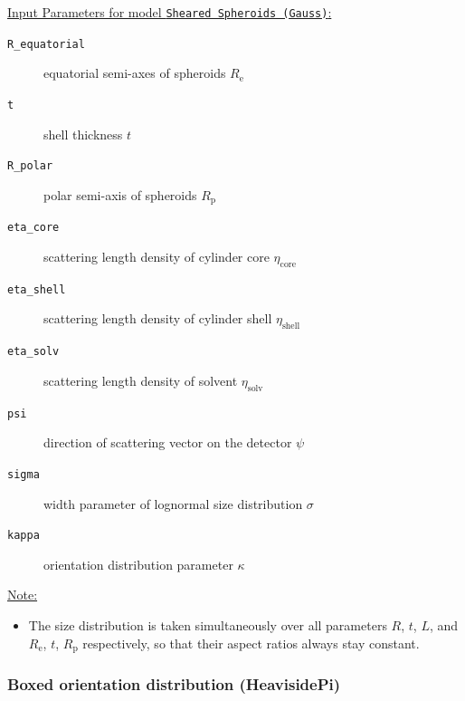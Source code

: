 \vspace{5mm}

\underline{Input Parameters for model \texttt{Sheared Spheroids (Gauss)}:}\\
\begin{description}
\item[\texttt{R\_equatorial}] equatorial semi-axes of spheroids $R_\mathrm{e}$
\item[\texttt{t}] shell thickness $t$
\item[\texttt{R\_polar}] polar semi-axis of spheroids $R_\mathrm{p}$
\item[\texttt{eta\_core}] scattering length density of cylinder core $\eta_\mathrm{core}$
\item[\texttt{eta\_shell}] scattering length density of cylinder shell $\eta_\mathrm{shell}$
\item[\texttt{eta\_solv}] scattering length density of solvent $\eta_\mathrm{solv}$
\item[\texttt{psi}] direction of scattering vector on the detector $\psi$
\item[{\texttt{sigma}}] width parameter of lognormal size distribution $\sigma$
\item[{\texttt{kappa}}] orientation distribution parameter $\kappa$
\end{description}

\vspace{5mm}

\underline{Note:}
\begin{itemize}
\item The size distribution is taken simultaneously over all parameters $R$, $t$, $L$, and $R_\mathrm{e}$, $t$, $R_\mathrm{p}$ respectively, so that their aspect ratios always stay constant.
\end{itemize}


\newpage
\subsubsection{Boxed orientation distribution (HeavisidePi)} ~\\

